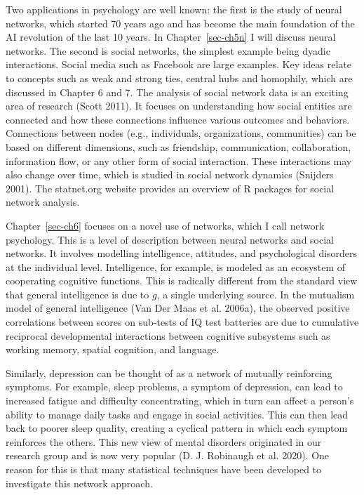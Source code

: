 \documentclass[
  a4paper,
  DIV=11,
  numbers=noendperiod,
  oneside]{scrreprt}
\begin{document}
Two applications in psychology are well known: the first is the study of
neural networks, which started 70 years ago and has become the main
foundation of the AI revolution of the last 10 years. In
Chapter~\ref{sec-ch5n} I will discuss neural networks. The second is
social networks, the simplest example being dyadic interactions. Social
media such as Facebook are large examples. Key ideas relate to concepts
such as weak and strong ties, central hubs and homophily, which are
discussed in Chapter 6 and 7. The analysis of social network data is an
exciting area of research (Scott 2011). It focuses on understanding how
social entities are connected and how these connections influence
various outcomes and behaviors. Connections between nodes (e.g.,
individuals, organizations, communities) can be based on different
dimensions, such as friendship, communication, collaboration,
information flow, or any other form of social interaction. These
interactions may also change over time, which is studied in social
network dynamics (Snijders 2001). The statnet.org website provides an
overview of R packages for social network analysis.

Chapter~\ref{sec-ch6} focuses on a novel use of networks, which I call
network psychology. This is a level of description between neural
networks and social networks. It involves modelling intelligence,
attitudes, and psychological disorders at the individual level.
Intelligence, for example, is modeled as an ecosystem of cooperating
cognitive functions. This is radically different from the standard view
that general intelligence is due to \(g\), a single underlying source.
In the mutualism model of general intelligence (Van Der Maas et al.
2006a), the observed positive correlations between scores on sub-tests
of IQ test batteries are due to cumulative reciprocal developmental
interactions between cognitive subsystems such as working memory,
spatial cognition, and language.

Similarly, depression can be thought of as a network of mutually
reinforcing symptoms. For example, sleep problems, a symptom of
depression, can lead to increased fatigue and difficulty concentrating,
which in turn can affect a person's ability to manage daily tasks and
engage in social activities. This can then lead back to poorer sleep
quality, creating a cyclical pattern in which each symptom reinforces
the others. This new view of mental disorders originated in our research
group and is now very popular (D. J. Robinaugh et al. 2020). One reason
for this is that many statistical techniques have been developed to
investigate this network approach.
\end{document}
